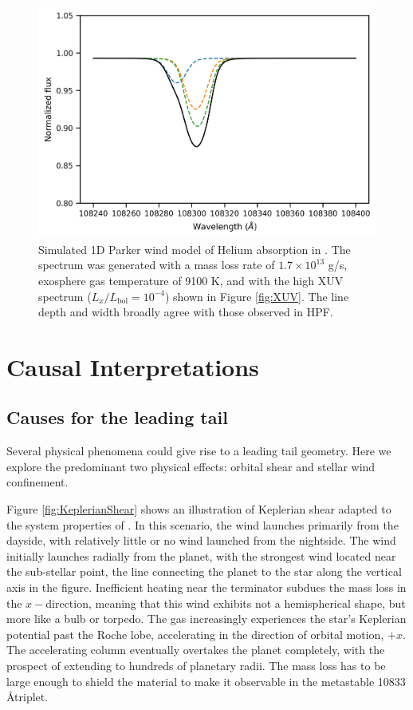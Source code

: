 \documentclass[twocolumn]{aastex631}
\newcommand{\hatpb}{\object{HAT-P-67 b}}
\begin{document}
\begin{figure}
    \includegraphics[width=\linewidth]{figures/pwinds_1D_higXUV_t1p2Gyr.png}
    \caption{Simulated 1D Parker wind model of Helium absorption in \hatpb.  The spectrum was generated with a mass loss rate of $1.7\times10^{13}$ g/s, exosphere gas temperature of 9100 K, and with the high XUV spectrum ($L_x/L_\mathrm{bol}=10^{-4}$) shown in Figure \ref{fig:XUV}.  The line depth and width broadly agree with those observed in HPF.}
    \label{fig:pwinds}
\end{figure}


\section{Causal Interpretations} \label{secDiscuss}

\subsection{Causes for the leading tail} \label{secLeading}
Several physical phenomena could give rise to a leading tail geometry.  Here we explore the predominant two physical effects: orbital shear and stellar wind confinement.

Figure \ref{fig:KeplerianShear} shows an illustration of Keplerian shear adapted to the system properties of \hatpb.  In this scenario, the wind launches primarily from the dayside, with relatively little or no wind launched from the nightside.  The wind initially launches radially from the planet, with the strongest wind located near the sub-stellar point, the line connecting the planet to the star along the vertical axis in the figure.  Inefficient heating near the terminator subdues the mass loss in the $x-$direction, meaning that this wind exhibits not a hemispherical shape, but more like a bulb or torpedo.  The gas increasingly experiences the star's Keplerian potential past the Roche lobe, accelerating in the direction of orbital motion, $+x$.  The accelerating column eventually overtakes the planet completely, with the prospect of extending to hundreds of planetary radii.  The mass loss has to be large enough to shield the material to make it observable in the metastable  10833 \AA triplet.
\end{document}
